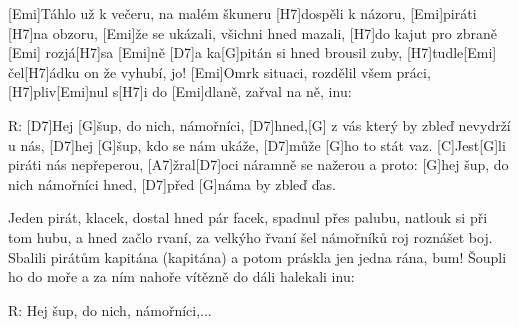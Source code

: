 

[Emi]Táhlo už k večeru, na malém škuneru
[H7]dospěli k názoru, [Emi]\null piráti [H7]na obzoru,
[Emi]\null že se ukázali, všichni hned mazali,
[H7]do kajut pro zbraně [Emi] rozjá[H7]sa [Emi]ně
[D7]a ka[G]pitán si hned brousil zuby,
[H7]tudle[Emi] čel[H7]\null ádku on že vyhubí, jo!
[Emi]Omrk situaci, rozdělil všem práci,
[H7]pliv[Emi]nul s[H7]i do [Emi]dlaně, zařval na ně, inu:

R: [D7]Hej [G]\null šup, do nich, námořníci,
[D7]hned,[G] z vás který by zbleď nevydrží u nás,
[D7]hej [G]\null šup, kdo se nám ukáže,
[D7]může [G]ho to stát vaz.
[C]Jest[G]li piráti nás nepřeperou,
[A7]\null žral[D7]oci náramně se nažerou a proto:
[G]hej šup, do nich námořníci hned,
[D7]před [G]náma by zbleď ďas.

Jeden pirát, klacek, dostal hned pár facek,
spadnul přes palubu, natlouk si při tom hubu,
a hned začlo rvaní, za velkýho řvaní
šel námořníků roj roznášet boj.
Sbalili pirátům kapitána (kapitána)
a potom práskla jen jedna rána, bum!
Šoupli ho do moře a za ním nahoře
vítězně do dáli halekali inu:

R: Hej šup, do nich, námořníci,...


